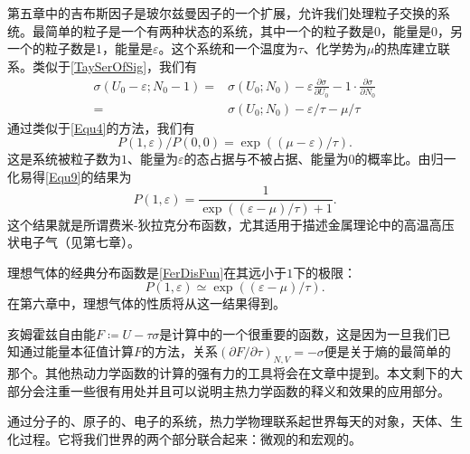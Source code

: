 第五章中的吉布斯因子是玻尔兹曼因子的一个扩展，允许我们处理粒子交换的系统。最简单的粒子是一个有两种状态的系统，其中一个的粒子数是$0$，能量是$0$，另一个的粒子数是$1$，能量是$\varepsilon$。这个系统和一个温度为$\tau$、化学势为$\mu$的热库建立联系。类似于\eqref{TaySerOfSig}，我们有
\begin{equation}
    \begin{aligned}
        \sigma \left( U_0-\varepsilon ;N_0-1 \right) =&\sigma \left( U_0;N_0 \right) -\varepsilon \frac{\partial \sigma}{\partial U_0}-1\cdot \frac{\partial \sigma}{\partial N_0}
        \\
        =&\sigma \left( U_0;N_0 \right) -\varepsilon /\tau -\mu /\tau 
    \end{aligned}
\end{equation}
通过类似于\eqref{Equ4}的方法，我们有
\begin{equation}
    P(1,\varepsilon)/P(0,0)=\exp((\mu-\varepsilon)/\tau).\label{Equ9}
\end{equation}
这是系统被粒子数为$1$、能量为$\varepsilon$的态占据与不被占据、能量为$0$的概率比。由归一化易得\eqref{Equ9}的结果为
\begin{equation}
    P(1,\varepsilon)=\frac{1}{\exp((\varepsilon-\mu)/\tau)+1}.\label{FerDisFun}
\end{equation}
这个结果就是所谓费米-狄拉克分布函数，尤其适用于描述金属理论中的高温高压状电子气（见第七章）。

理想气体的经典分布函数是\eqref{FerDisFun}在其远小于$1$下的极限：
\begin{equation}
    P(1,\varepsilon)\simeq\exp((\varepsilon-\mu)/\tau).
\end{equation}
在第六章中，理想气体的性质将从这一结果得到。

亥姆霍兹自由能$F\coloneqq U-\tau\sigma$是计算中的一个很重要的函数，这是因为一旦我们已知通过能量本征值计算$F$的方法，关系$(\partial F/\partial\tau)_{N,V}=-\sigma$便是关于熵的最简单的那个。其他热动力学函数的计算的强有力的工具将会在文章中提到。本文剩下的大部分会注重一些很有用处并且可以说明主热力学函数的释义和效果的应用部分。

通过分子的、原子的、电子的系统，热力学物理联系起世界每天的对象，天体、生化过程。它将我们世界的两个部分联合起来：微观的和宏观的。